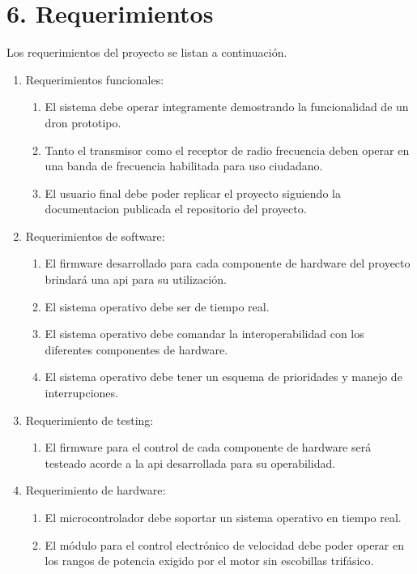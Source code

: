 \documentclass[
11pt, %
]{charter}
\begin{document}
\section{6. Requerimientos}
\label{sec:requerimientos}


	Los requerimientos del proyecto se listan a continuaci\'on.

	\begin{enumerate}
		\item Requerimientos funcionales:
		      \begin{enumerate}
			      \item El sistema debe operar integramente demostrando la funcionalidad de un dron prototipo. 
			      \item Tanto el transmisor como el receptor de radio frecuencia deben operar en una banda de frecuencia habilitada para uso ciudadano.
			      \item El usuario final debe poder replicar el proyecto siguiendo la documentacion publicada el repositorio del proyecto.  
		      \end{enumerate}
		\item Requerimientos de software:
			  \begin{enumerate}
			      \item El firmware desarrollado para cada componente de hardware del proyecto brindar\'a una api para su
utilizaci\'on.
				  \item El sistema operativo debe ser de tiempo real.			      
			      \item El sistema operativo debe comandar la interoperabilidad con los diferentes componentes de hardware.
			      \item El sistema operativo debe tener un esquema de prioridades y manejo de interrupciones.
		      \end{enumerate}
		\item Requerimiento de testing:
			 \begin{enumerate}
			      \item El firmware para el control de cada componente de hardware ser\'a testeado acorde a la api desarrollada para su operabilidad.
		     \end{enumerate}
		\item Requerimiento de hardware:
			 \begin{enumerate}
			      \item El microcontrolador debe soportar un sistema operativo en tiempo real.
			      \item El m\'odulo para el control electr\'onico de velocidad debe poder operar en los rangos de potencia exigido por el motor sin escobillas trif\'asico.

\end{enumerate}
\end{enumerate}
\end{document}
